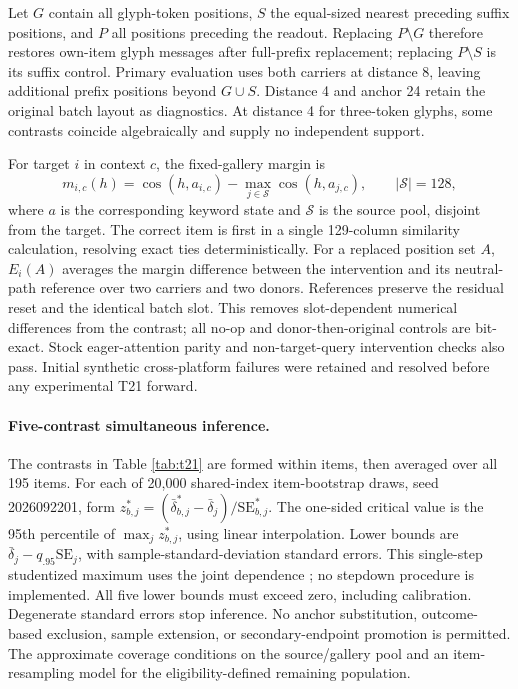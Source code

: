 \documentclass{article}
\begin{document}
Let $G$ contain all glyph-token positions, $S$ the equal-sized nearest
preceding suffix positions, and $P$ all positions preceding the readout.
Replacing $P\setminus G$ therefore restores own-item glyph messages after
full-prefix replacement; replacing $P\setminus S$ is its suffix control.
Primary evaluation uses both carriers at distance 8, leaving additional
prefix positions beyond $G\cup S$. Distance 4 and anchor 24 retain the
original batch layout as diagnostics. At distance 4 for three-token glyphs,
some contrasts coincide algebraically and supply no independent support.

For target $i$ in context $c$, the fixed-gallery margin is
\[
 m_{i,c}(h)=\cos(h,a_{i,c})-
 \max_{j\in\mathcal S}\cos(h,a_{j,c}),\qquad |\mathcal S|=128,
\]
where $a$ is the corresponding keyword state and $\mathcal S$ is the source
pool, disjoint from the target. The correct item is first in a single
129-column similarity calculation, resolving exact ties deterministically.
For a replaced position set $A$, $E_i(A)$ averages the margin difference
between the intervention and its neutral-path reference over two carriers
and two donors. References preserve the residual reset and the identical
batch slot. This removes slot-dependent numerical differences from the
contrast; all no-op and donor-then-original controls are bit-exact.
Stock eager-attention parity and non-target-query intervention checks also
pass. Initial synthetic cross-platform failures were retained and resolved
before any experimental T21 forward.

\paragraph{Five-contrast simultaneous inference.}
The contrasts in Table \ref{tab:t21} are formed within items, then averaged
over all 195 items. For each of 20,000 shared-index item-bootstrap draws,
seed 2026092201, form
$z^*_{b,j}=(\bar\delta^*_{b,j}-\bar\delta_j)/\mathrm{SE}^*_{b,j}$.
The one-sided critical value is the 95th percentile of
$\max_j z^*_{b,j}$, using linear interpolation. Lower bounds are
$\bar\delta_j-q_{.95}\mathrm{SE}_j$, with sample-standard-deviation standard
errors. This single-step studentized maximum uses the joint dependence
\citep{romano2005stepdown}; no stepdown procedure is implemented. All five
lower bounds must exceed zero, including calibration. Degenerate standard
errors stop inference. No anchor substitution, outcome-based exclusion,
sample extension, or secondary-endpoint promotion is permitted. The
approximate coverage conditions on the source/gallery pool and an
item-resampling model for the eligibility-defined remaining population.
\end{document}
